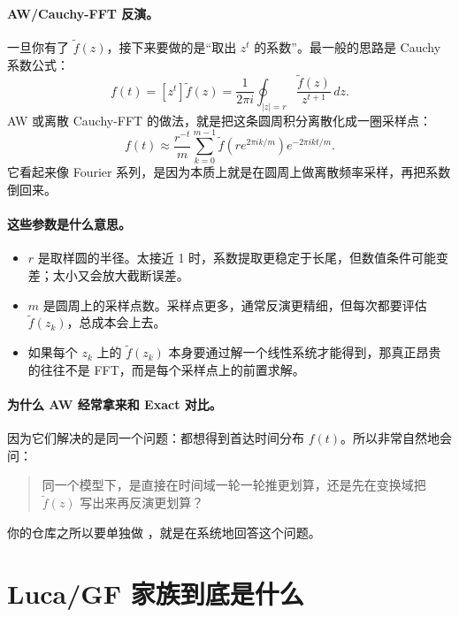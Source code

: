 \documentclass[11pt,fontset=fandol]{ctexart}
\begin{document}
\paragraph{AW/Cauchy-FFT 反演。}
一旦你有了 $\widetilde f(z)$，接下来要做的是“取出 $z^t$ 的系数”。最一般的思路是 Cauchy 系数公式：
\begin{equation}
  f(t)=[z^t]\widetilde f(z)
  =
  \frac{1}{2\pi i}\oint_{|z|=r}\frac{\widetilde f(z)}{z^{t+1}}\,dz.
  \label{eq:cauchy-coeff}
\end{equation}
AW 或离散 Cauchy-FFT 的做法，就是把这条圆周积分离散化成一圈采样点：
\begin{equation}
  f(t)
  \approx
  \frac{r^{-t}}{m}
  \sum_{k=0}^{m-1}
  \widetilde f\!\left(re^{2\pi i k/m}\right)
  e^{-2\pi i kt/m}.
  \label{eq:aw-basic}
\end{equation}
它看起来像 Fourier 系列，是因为本质上就是在圆周上做离散频率采样，再把系数倒回来。

\paragraph{这些参数是什么意思。}
\begin{itemize}
  \item $r$ 是取样圆的半径。太接近 1 时，系数提取更稳定于长尾，但数值条件可能变差；太小又会放大截断误差。
  \item $m$ 是圆周上的采样点数。采样点更多，通常反演更精细，但每次都要评估 $\widetilde f(z_k)$，总成本会上去。
  \item 如果每个 $z_k$ 上的 $\widetilde f(z_k)$ 本身要通过解一个线性系统才能得到，那真正昂贵的往往不是 FFT，而是每个采样点上的前置求解。
\end{itemize}

\paragraph{为什么 AW 经常拿来和 Exact 对比。}
因为它们解决的是同一个问题：都想得到首达时间分布 $f(t)$。所以非常自然地会问：
\begin{quote}
同一个模型下，是直接在时间域一轮一轮推更划算，还是先在变换域把 $\widetilde f(z)$ 写出来再反演更划算？
\end{quote}
你的仓库之所以要单独做 ，就是在系统地回答这个问题。

\section{Luca/GF 家族到底是什么}
\end{document}
